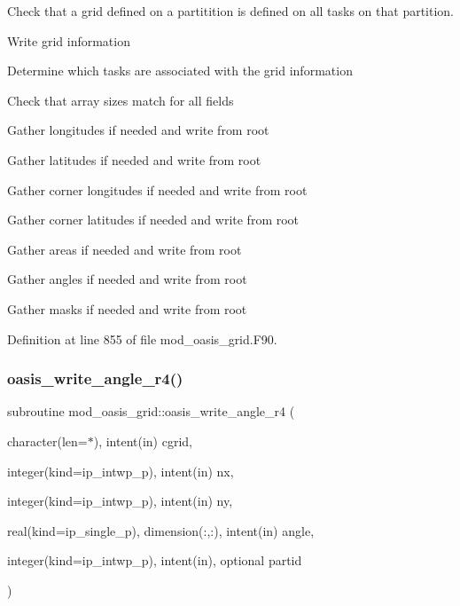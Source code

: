 \begin{DoxyItemize}
\item Check that a grid defined on a partitition is defined on all tasks on that partition.
\item Write grid information
\begin{DoxyItemize}
\item Determine which tasks are associated with the grid information
\item Check that array sizes match for all fields
\item Gather longitudes if needed and write from root
\item Gather latitudes if needed and write from root
\item Gather corner longitudes if needed and write from root
\item Gather corner latitudes if needed and write from root
\item Gather areas if needed and write from root
\item Gather angles if needed and write from root
\item Gather masks if needed and write from root 
\end{DoxyItemize}
\end{DoxyItemize}

Definition at line 855 of file mod\+\_\+oasis\+\_\+grid.\+F90.

\mbox{\label{namespacemod__oasis__grid_aa4f44626552980d5418d77447e1ce058}} 
\subsubsection{\texorpdfstring{oasis\+\_\+write\+\_\+angle\+\_\+r4()}{oasis\_write\_angle\_r4()}}
{\footnotesize\ttfamily subroutine mod\+\_\+oasis\+\_\+grid\+::oasis\+\_\+write\+\_\+angle\+\_\+r4 (\begin{DoxyParamCaption}\item[{character(len=$\ast$), intent(in)}]{cgrid,  }\item[{integer(kind=ip\+\_\+intwp\+\_\+p), intent(in)}]{nx,  }\item[{integer(kind=ip\+\_\+intwp\+\_\+p), intent(in)}]{ny,  }\item[{real(kind=ip\+\_\+single\+\_\+p), dimension(\+:,\+:), intent(in)}]{angle,  }\item[{integer(kind=ip\+\_\+intwp\+\_\+p), intent(in), optional}]{partid }\end{DoxyParamCaption})\hspace{0.3cm}{\ttfamily [private]}}



